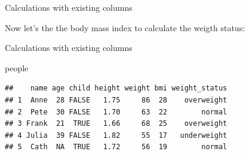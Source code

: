 \documentclass[ignorenonframetext,]{beamer}
\newenvironment{Shaded}{\begin{snugshade}}{\end{snugshade}}
\newcommand{\FloatTok}[1]{\textcolor[rgb]{0.00,0.00,0.81}{#1}}
\newcommand{\KeywordTok}[1]{\textcolor[rgb]{0.13,0.29,0.53}{\textbf{#1}}}
\newcommand{\NormalTok}[1]{#1}
\newcommand{\OperatorTok}[1]{\textcolor[rgb]{0.81,0.36,0.00}{\textbf{#1}}}
\newcommand{\StringTok}[1]{\textcolor[rgb]{0.31,0.60,0.02}{#1}}
\begin{document}
\begin{frame}[fragile]{Calculations with existing columns}
\protect\hypertarget{calculations-with-existing-columns-1}{}

Now let's the the body mass index to calculate the weigth status:

\begin{Shaded}
\end{Shaded}

\end{frame}

\begin{frame}[fragile]{Calculations with existing columns}
\protect\hypertarget{calculations-with-existing-columns-2}{}

\begin{Shaded}
\begin{Highlighting}[]
\NormalTok{people}
\end{Highlighting}
\end{Shaded}

\begin{verbatim}
##    name age child height weight bmi weight_status
## 1  Anne  28 FALSE   1.75     86  28    overweight
## 2  Pete  30 FALSE   1.70     63  22        normal
## 3 Frank  21  TRUE   1.66     68  25    overweight
## 4 Julia  39 FALSE   1.82     55  17   underweight
## 5  Cath  NA  TRUE   1.72     56  19        normal
\end{verbatim}

\end{frame}
\end{document}
